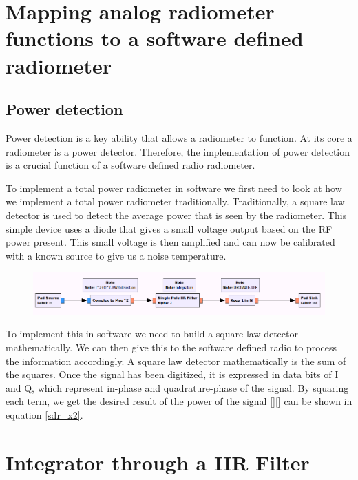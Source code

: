 \section{Mapping analog radiometer functions to a software defined radiometer}
\subsection{Power detection}
Power detection is a key ability that allows a radiometer to function.  At its core a radiometer is a power detector.  Therefore, the implementation of power detection is a crucial function of a software defined radio radiometer.

To implement a total power radiometer in software we first need to look at how we implement a total power radiometer traditionally.  Traditionally, a square law detector is used to detect the average power that is seen by the radiometer.  This simple device uses a diode that gives a small voltage output based on the RF power present.  This small voltage is then amplified and can now be calibrated with a known source to give us a noise temperature.  

{\begin{figure}[h!tb] 
\centering
\includegraphics[width=17cm]{Images/TPR_grc.png}
\label{square_block}
\end{figure}
}

To implement this in software we need to build a square law detector mathematically.  We can then give this to the software defined radio to process the information accordingly.  A square law detector mathematically is the sum of the squares.  Once the signal has been digitized, it is expressed in data bits of I and Q, which represent in-phase and quadrature-phase of the signal.  By squaring each term, we get the desired result of the power of the signal [\cite{Sarijari}][\cite{Rashid}] can be shown in equation \ref{sdr_x2}.

\section{Integrator through a IIR Filter}

